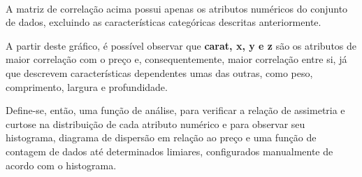 \documentclass[11pt]{article}
\begin{document}
    \begin{center}
    \end{center}
    { \hspace*{\fill} \\}
    
    A matriz de correlação acima possui apenas os atributos numéricos do
conjunto de dados, excluindo as características categóricas descritas
anteriormente.

A partir deste gráfico, é possível observar que \textbf{carat, x, y e z}
são os atributos de maior correlação com o preço e, consequentemente,
maior correlação entre si, já que descrevem características dependentes
umas das outras, como peso, comprimento, largura e profundidade.

    Define-se, então, uma função de análise, para verificar a relação de
assimetria e curtose na distribuição de cada atributo numérico e para
observar seu histograma, diagrama de dispersão em relação ao preço e uma
função de contagem de dados até determinados limiares, configurados
manualmente de acordo com o histograma.
\end{document}
